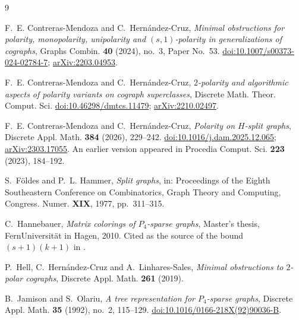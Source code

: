 \documentclass[11pt]{amsart}
\theoremstyle{definition}
\theoremstyle{remark}
\begin{document}
\begin{thebibliography}{9}

F.~E. Contreras-Mendoza and C.~Hern\'andez-Cruz,
\emph{Minimal obstructions for polarity, monopolarity, unipolarity and $(s,1)$-polarity in
generalizations of cographs},
Graphs Combin. \textbf{40} (2024), no.~3, Paper No.~53.
\href{https://doi.org/10.1007/s00373-024-02784-7}{doi:10.1007/s00373-024-02784-7};
\href{https://arxiv.org/abs/2203.04953}{arXiv:2203.04953}.

F.~E. Contreras-Mendoza and C.~Hern\'andez-Cruz,
\emph{$2$-polarity and algorithmic aspects of polarity variants on cograph superclasses},
Discrete Math. Theor. Comput. Sci.
\href{https://doi.org/10.46298/dmtcs.11479}{doi:10.46298/dmtcs.11479};
\href{https://arxiv.org/abs/2210.02497}{arXiv:2210.02497}.

F.~E. Contreras-Mendoza and C.~Hern\'andez-Cruz,
\emph{Polarity on $H$-split graphs},
Discrete Appl. Math. \textbf{384} (2026), 229--242.
\href{https://doi.org/10.1016/j.dam.2025.12.065}{doi:10.1016/j.dam.2025.12.065};
\href{https://arxiv.org/abs/2303.17055}{arXiv:2303.17055}.
An earlier version appeared in Procedia Comput. Sci. \textbf{223} (2023), 184--192.

S.~F\"oldes and P.~L. Hammer,
\emph{Split graphs},
in: Proceedings of the Eighth Southeastern Conference on Combinatorics, Graph Theory and
Computing, Congress. Numer. \textbf{XIX}, 1977, pp.~311--315.

C.~Hannebauer,
\emph{Matrix colorings of $P_4$-sparse graphs},
Master's thesis, FernUniversit\"at in Hagen, 2010.
Cited as the source of the bound $(s+1)(k+1)$ in \cite[Theorem~57]{CMHC24}.

P.~Hell, C.~Hern\'andez-Cruz and A.~Linhares-Sales,
\emph{Minimal obstructions to $2$-polar cographs},
Discrete Appl. Math. \textbf{261} (2019).

B.~Jamison and S.~Olariu,
\emph{A tree representation for $P_4$-sparse graphs},
Discrete Appl. Math. \textbf{35} (1992), no.~2, 115--129.
\href{https://doi.org/10.1016/0166-218X(92)90036-B}{doi:10.1016/0166-218X(92)90036-B}.

\end{thebibliography}
\end{document}
